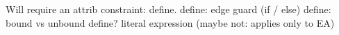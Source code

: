 Will require an attrib constraint: define.
define: edge guard (if / else)
define: bound vs unbound
define? literal expression (maybe not: applies only to EA)





